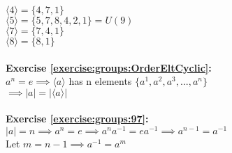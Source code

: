 $\langle4\rangle=\{4,7,1\}$\\
$\langle5\rangle=\{5,7,8,4,2,1\}=U(9)$\\
$\langle7\rangle=\{7,4,1\}$\\
$\langle8\rangle=\{8,1\}$\\
\\
\textbf{Exercise \ref{exercise:groups:OrderEltCyclic}:}\\
$a^n=e\implies \langle a\rangle$ has n elements $\{a^1,a^2,a^3,...,a^n\}$\\
$\implies |a|=|\langle a\rangle|$\\
\\
\textbf{Exercise \ref{exercise:groups:97}:}\\
$|a|=n\implies a^n=e\implies a^na^{-1}=ea^{-1}\implies a^{n-1}=a^{-1}$\\
Let $m=n-1 \implies a^{-1}=a^m$\\

